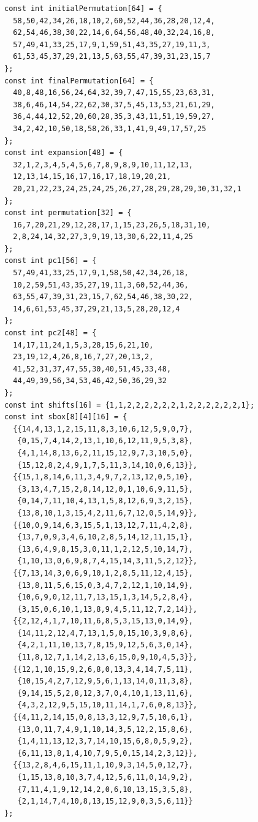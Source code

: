\documentclass[11pt,a4paper]{article}
\begin{document}
\begin{lstlisting}[style=cpp]
const int initialPermutation[64] = {
  58,50,42,34,26,18,10,2,60,52,44,36,28,20,12,4,
  62,54,46,38,30,22,14,6,64,56,48,40,32,24,16,8,
  57,49,41,33,25,17,9,1,59,51,43,35,27,19,11,3,
  61,53,45,37,29,21,13,5,63,55,47,39,31,23,15,7
};
const int finalPermutation[64] = {
  40,8,48,16,56,24,64,32,39,7,47,15,55,23,63,31,
  38,6,46,14,54,22,62,30,37,5,45,13,53,21,61,29,
  36,4,44,12,52,20,60,28,35,3,43,11,51,19,59,27,
  34,2,42,10,50,18,58,26,33,1,41,9,49,17,57,25
};
const int expansion[48] = {
  32,1,2,3,4,5,4,5,6,7,8,9,8,9,10,11,12,13,
  12,13,14,15,16,17,16,17,18,19,20,21,
  20,21,22,23,24,25,24,25,26,27,28,29,28,29,30,31,32,1
};
const int permutation[32] = {
  16,7,20,21,29,12,28,17,1,15,23,26,5,18,31,10,
  2,8,24,14,32,27,3,9,19,13,30,6,22,11,4,25
};
const int pc1[56] = {
  57,49,41,33,25,17,9,1,58,50,42,34,26,18,
  10,2,59,51,43,35,27,19,11,3,60,52,44,36,
  63,55,47,39,31,23,15,7,62,54,46,38,30,22,
  14,6,61,53,45,37,29,21,13,5,28,20,12,4
};
const int pc2[48] = {
  14,17,11,24,1,5,3,28,15,6,21,10,
  23,19,12,4,26,8,16,7,27,20,13,2,
  41,52,31,37,47,55,30,40,51,45,33,48,
  44,49,39,56,34,53,46,42,50,36,29,32
};
const int shifts[16] = {1,1,2,2,2,2,2,2,1,2,2,2,2,2,2,1};
const int sbox[8][4][16] = {
  {{14,4,13,1,2,15,11,8,3,10,6,12,5,9,0,7},
   {0,15,7,4,14,2,13,1,10,6,12,11,9,5,3,8},
   {4,1,14,8,13,6,2,11,15,12,9,7,3,10,5,0},
   {15,12,8,2,4,9,1,7,5,11,3,14,10,0,6,13}},
  {{15,1,8,14,6,11,3,4,9,7,2,13,12,0,5,10},
   {3,13,4,7,15,2,8,14,12,0,1,10,6,9,11,5},
   {0,14,7,11,10,4,13,1,5,8,12,6,9,3,2,15},
   {13,8,10,1,3,15,4,2,11,6,7,12,0,5,14,9}},
  {{10,0,9,14,6,3,15,5,1,13,12,7,11,4,2,8},
   {13,7,0,9,3,4,6,10,2,8,5,14,12,11,15,1},
   {13,6,4,9,8,15,3,0,11,1,2,12,5,10,14,7},
   {1,10,13,0,6,9,8,7,4,15,14,3,11,5,2,12}},
  {{7,13,14,3,0,6,9,10,1,2,8,5,11,12,4,15},
   {13,8,11,5,6,15,0,3,4,7,2,12,1,10,14,9},
   {10,6,9,0,12,11,7,13,15,1,3,14,5,2,8,4},
   {3,15,0,6,10,1,13,8,9,4,5,11,12,7,2,14}},
  {{2,12,4,1,7,10,11,6,8,5,3,15,13,0,14,9},
   {14,11,2,12,4,7,13,1,5,0,15,10,3,9,8,6},
   {4,2,1,11,10,13,7,8,15,9,12,5,6,3,0,14},
   {11,8,12,7,1,14,2,13,6,15,0,9,10,4,5,3}},
  {{12,1,10,15,9,2,6,8,0,13,3,4,14,7,5,11},
   {10,15,4,2,7,12,9,5,6,1,13,14,0,11,3,8},
   {9,14,15,5,2,8,12,3,7,0,4,10,1,13,11,6},
   {4,3,2,12,9,5,15,10,11,14,1,7,6,0,8,13}},
  {{4,11,2,14,15,0,8,13,3,12,9,7,5,10,6,1},
   {13,0,11,7,4,9,1,10,14,3,5,12,2,15,8,6},
   {1,4,11,13,12,3,7,14,10,15,6,8,0,5,9,2},
   {6,11,13,8,1,4,10,7,9,5,0,15,14,2,3,12}},
  {{13,2,8,4,6,15,11,1,10,9,3,14,5,0,12,7},
   {1,15,13,8,10,3,7,4,12,5,6,11,0,14,9,2},
   {7,11,4,1,9,12,14,2,0,6,10,13,15,3,5,8},
   {2,1,14,7,4,10,8,13,15,12,9,0,3,5,6,11}}
};


\end{lstlisting}
\end{document}
